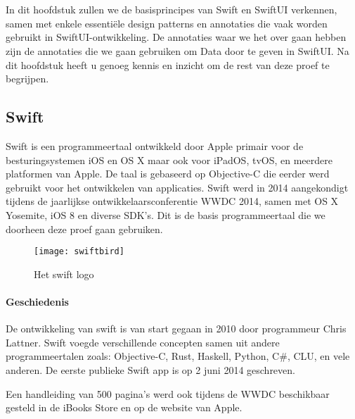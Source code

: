 \chapter{}%
\label{ch:stand-van-zaken}


In dit hoofdstuk zullen we de basisprincipes van Swift en SwiftUI verkennen, samen met enkele essentiële design patterns en annotaties die vaak worden gebruikt in SwiftUI-ontwikkeling. De annotaties waar we het over gaan hebben zijn de annotaties die we gaan gebruiken om Data door te geven in SwiftUI. Na dit hoofdstuk heeft u genoeg kennis en inzicht om de rest van deze proef te begrijpen.

\section{Swift}
\autocite{WikiSwift} Swift is een programmeertaal ontwikkeld door Apple primair voor de besturingsystemen iOS en OS X maar ook voor iPadOS, tvOS, en meerdere platformen van Apple. De taal is gebaseerd op Objective-C die eerder werd gebruikt voor het ontwikkelen van applicaties. Swift werd in 2014 aangekondigt tijdens de jaarlijkse ontwikkelaarsconferentie WWDC 2014, samen met OS X Yosemite, iOS 8 en diverse SDK's. Dit is de basis programmeertaal die we doorheen deze proef gaan gebruiken.
\begin{figure}[H]
    \centering
    \texttt{[image: swiftbird]} 
    \caption{Het swift logo}
    \label{fig:swift}
\end{figure}
\subsubsection{Geschiedenis}
De ontwikkeling van swift is van start gegaan in 2010 door programmeur Chris Lattner. Swift voegde verschillende concepten samen uit andere programmeertalen zoals: Objective-C, Rust, Haskell, Python, C\#, CLU, en vele anderen. De eerste publieke Swift app is op 2 juni 2014 geschreven.

Een handleiding van 500 pagina's werd ook tijdens de WWDC beschikbaar gesteld in de iBooks Store en op de website van Apple.
